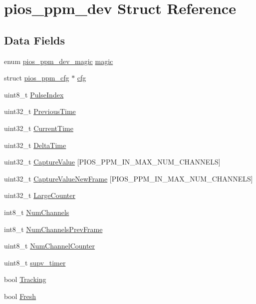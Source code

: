 \hypertarget{structpios__ppm__dev}{\section{pios\-\_\-ppm\-\_\-dev \-Struct \-Reference}
\label{structpios__ppm__dev}
}
\subsection*{\-Data \-Fields}
\begin{DoxyCompactItemize}
\item 
enum \hyperlink{group___p_i_o_s___p_p_m_ga6d320e57fe875e76b2fa71a688f865aa}{pios\-\_\-ppm\-\_\-dev\-\_\-magic} \hyperlink{structpios__ppm__dev_a1e45b2498e0e64e13001774d17d95417}{magic}
\item 
struct \hyperlink{structpios__ppm__cfg}{pios\-\_\-ppm\-\_\-cfg} $\ast$ \hyperlink{structpios__ppm__dev_a570855666b2b9414a8e77ad4058649ce}{cfg}
\item 
uint8\-\_\-t \hyperlink{structpios__ppm__dev_a86d68429cfa42b6688d6bc4c307de08e}{\-Pulse\-Index}
\item 
uint32\-\_\-t \hyperlink{structpios__ppm__dev_acdc4c4f35b3ab795bcf29ecc9a3f4b45}{\-Previous\-Time}
\item 
uint32\-\_\-t \hyperlink{structpios__ppm__dev_a789b591ce1dee1c69df37405c130cd91}{\-Current\-Time}
\item 
uint32\-\_\-t \hyperlink{structpios__ppm__dev_a551519de53d5ad750d8e360f4fcacd53}{\-Delta\-Time}
\item 
uint32\-\_\-t \hyperlink{structpios__ppm__dev_af78c364c08454847be99632c8a2f4bdf}{\-Capture\-Value} \mbox{[}\-P\-I\-O\-S\-\_\-\-P\-P\-M\-\_\-\-I\-N\-\_\-\-M\-A\-X\-\_\-\-N\-U\-M\-\_\-\-C\-H\-A\-N\-N\-E\-L\-S\mbox{]}
\item 
uint32\-\_\-t \hyperlink{structpios__ppm__dev_a5fee214f001bdd57610a6db6573fbd7d}{\-Capture\-Value\-New\-Frame} \mbox{[}\-P\-I\-O\-S\-\_\-\-P\-P\-M\-\_\-\-I\-N\-\_\-\-M\-A\-X\-\_\-\-N\-U\-M\-\_\-\-C\-H\-A\-N\-N\-E\-L\-S\mbox{]}
\item 
uint32\-\_\-t \hyperlink{structpios__ppm__dev_ac18ce6183b9943ec4bae05ec82c8b595}{\-Large\-Counter}
\item 
int8\-\_\-t \hyperlink{structpios__ppm__dev_ad22d6ba25b163e89459fa089bb3a3d45}{\-Num\-Channels}
\item 
int8\-\_\-t \hyperlink{structpios__ppm__dev_ac648f6b4bdf6793c422676689daaca77}{\-Num\-Channels\-Prev\-Frame}
\item 
uint8\-\_\-t \hyperlink{structpios__ppm__dev_aace8701f1500560123d6eccc8a5150c3}{\-Num\-Channel\-Counter}
\item 
uint8\-\_\-t \hyperlink{structpios__ppm__dev_a8fdc1201ea1c7fe32a543a16a7b82be6}{supv\-\_\-timer}
\item 
bool \hyperlink{structpios__ppm__dev_a70b81899f6e07040bde7d33575b7c7ac}{\-Tracking}
\item 
bool \hyperlink{structpios__ppm__dev_a276c9eba5e4511f04af792d37819f808}{\-Fresh}
\end{DoxyCompactItemize}


